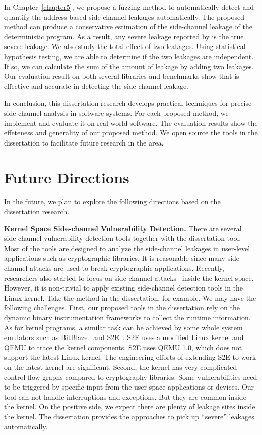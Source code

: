 In Chapter~\ref{chapter5}, we propose a fuzzing method to automatically detect and quantify the address-based side-channel leakages automatically. The proposed method can produce a conservative estimation of the side-channel leakage of the deterministic program. As a result, any severe leakage reported by \ctool{} is the true severe leakage. We also study the total effect of two leakages. Using statistical hypothesis testing, we are able to determine if the two leakages are independent. If so, we can calculate the sum of the amount of leakage by adding two leakages. Our evaluation result on both several libraries and benchmarks show that \ctool{} is effective and accurate in detecting the side-channel leakage.

In conclusion, this dissertation research develops practical techniques for precise side-channel analysis in software systems. For each proposed method, we implement and evaluate it on real-world software. The evaluation results show the effeteness and generality of our proposed method.  We open source the tools in the dissertation to facilitate future research in the area.
\section{Future Directions}
In the future, we plan to explore the following directions based on the dissertation research. 

\textbf{Kernel Space Side-channel Vulnerability Detection.} There are several side-channel vulnerability detection tools together with the dissertation tool. Most of the tools are designed to analyze the side-channel leakages in user-level applications such as cryptographic libraries. It is reasonable since many side-channel attacks are used to break cryptographic applications. Recently, researchers also started to focus on side-channel attacks~\cite{cao2016off} inside the kernel space. However, it is non-trivial to apply existing side-channel detection tools in the Linux kernel. Take the method in the dissertation, for example. We may have the following challenges. First, our proposed tools in the dissertation rely on the dynamic binary instrumentation frameworks to collect the runtime information. As for kernel programs, a similar task can be achieved by some whole system emulators such as BitBlaze~\cite{song2008bitblaze} and S2E~\cite{chipounov2012s2e}. S2E uses a modified Linux kernel and QEMU to trace the kernel components. S2E uses QEMU 1.0, which does not support the latest Linux kernel. The engineering efforts of extending S2E to work on the latest kernel are significant. Second, the kernel has very complicated control-flow graphs compared to cryptography libraries. Some vulnerabilities need to be triggered by specific input from the user space applications or devices. Our tool can not handle interruptions and exceptions. But they are common inside the kernel. On the positive side, we expect there are plenty of leakage sites inside the kernel. The dissertation provides the approaches to pick up ``severe'' leakages automatically.


